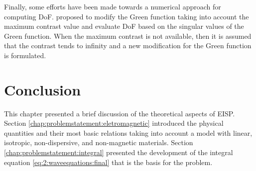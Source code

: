 			Finally, some efforts have been made towards a numerical approach for computing DoF. \cite{lin2021study} proposed to modify the Green function taking into account the maximum contrast value and evaluate DoF based on the singular values of the Green function. When the maximum contrast is not available, then it is assumed that the contrast tends to infinity and a new modification for the Green function is formulated. 
		
	\section{Conclusion}
	
		This chapter presented a brief discussion of the theoretical aspects of EISP. Section \ref{chap:problemstatement:eletromagnetic} introduced the physical quantities and their most basic relations taking into account a model with linear, isotropic, non-dispersive, and non-magnetic materials. Section \ref{chap:problemstatement:integral} presented the development of the integral equation \eqref{eq:2:waveequations:final} that is the basis for the problem.
		
